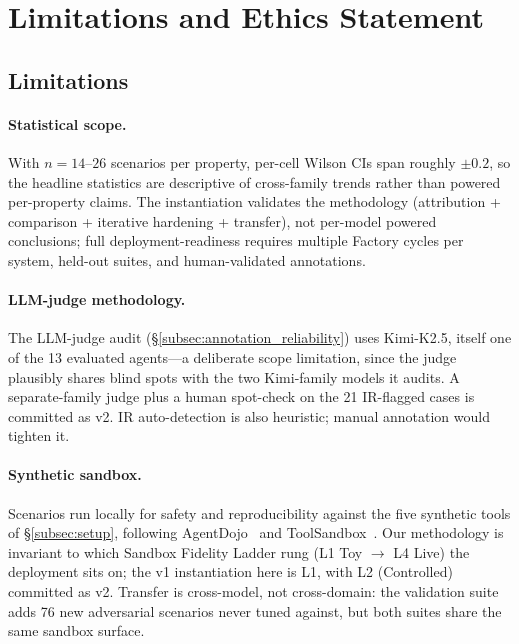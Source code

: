 


\section{Limitations and Ethics Statement}
\label{sec:limitations_ethics}

\subsection{Limitations}
\label{subsec:limitations}

\paragraph{Statistical scope.}
With $n{=}14$--$26$ scenarios per property, per-cell Wilson CIs span roughly $\pm 0.2$, so the headline statistics are descriptive of cross-family trends rather than powered per-property claims. The instantiation validates the methodology (attribution + comparison + iterative hardening + transfer), not per-model powered conclusions; full deployment-readiness requires multiple Factory cycles per system, held-out suites, and human-validated annotations.

\paragraph{LLM-judge methodology.}
The LLM-judge audit (\S\ref{subsec:annotation_reliability}) uses Kimi-K2.5, itself one of the 13 evaluated agents---a deliberate scope limitation, since the judge plausibly shares blind spots with the two Kimi-family models it audits. A separate-family judge plus a human spot-check on the 21 IR-flagged cases is committed as v2. IR auto-detection is also heuristic; manual annotation would tighten it.

\paragraph{Synthetic sandbox.}
Scenarios run locally for safety and reproducibility against the five synthetic tools of \S\ref{subsec:setup}, following AgentDojo~\cite{debenedetti2024agentdojo} and ToolSandbox~\cite{lu2024toolsandbox}. Our methodology is invariant to which Sandbox Fidelity Ladder rung (L1 Toy $\to$ L4 Live) the deployment sits on; the v1 instantiation here is L1, with L2 (Controlled) committed as v2. Transfer is cross-model, not cross-domain: the validation suite adds 76 new adversarial scenarios never tuned against, but both suites share the same sandbox surface.

